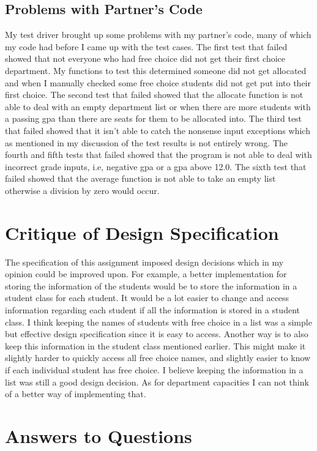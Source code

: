 \documentclass[12pt]{article}
\begin{document}
\subsection{Problems with Partner's Code}

My test driver brought up some problems with my partner's code, many of which my code had before I came up with the test cases. The first test that failed showed that not everyone who had free choice did not get their first choice department. My functions to test this determined someone did not get allocated and when I manually checked some free choice students did not get put into their first choice. The second test that failed showed that the allocate function is not able to deal with an empty department list or when there are more students with a passing gpa than there are seats for them to be allocated into. The third test that failed showed that it isn't able to catch the nonsense input exceptions which as mentioned in my discussion of the test results is not entirely wrong. The fourth and fifth tests that failed showed that the program is not able to deal with incorrect grade inputs, i.e, negative gpa or a gpa above 12.0. The sixth test that failed showed that the average function is not able to take an empty list otherwise a division by zero would occur.


\section{Critique of Design Specification}
The specification of this assignment imposed design decisions which in my opinion could be improved upon. For example, a better implementation for storing the information of the students would be to store the information in a student class for each student. It would be a lot easier to change and access information regarding each student if all the information is stored in a student class. I think keeping the names of students with free choice in a list was a simple but effective design specification since it is easy to access. Another way is to also keep this information in the student class mentioned earlier. This might make it slightly harder to quickly access all free choice names, and slightly easier to know if each individual student has free choice. I believe keeping the information in a list was still a good design decision. As for department capacities I can not think of a better way of implementing that. 

\section{Answers to Questions}
\end{document}
